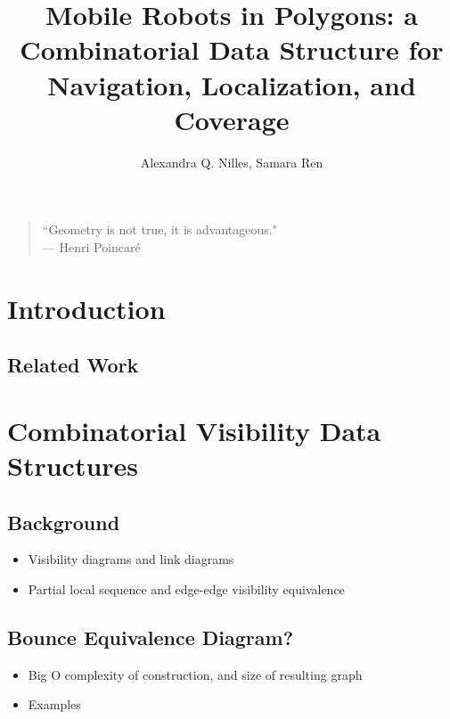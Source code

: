 \documentclass[letterpaper, 10 pt, conference]{ieeeconf}  %
\title{Mobile Robots in Polygons: a Combinatorial Data Structure for
Navigation, Localization, and Coverage}
\author{Alexandra Q. Nilles, Samara Ren%
}
\begin{document}
\maketitle

%

{\small
\begin{center}
\begin{quotation}
``Geometry is not true, it is advantageous." \\
\hfill    --- Henri Poincar\'e
\end{quotation}
\end{center}
}

\section{Introduction} 


\subsection{Related Work}

\section{Combinatorial Visibility Data Structures}

\subsection{Background}

\begin{itemize}
\item Visibility diagrams and link diagrams
\item Partial local sequence and edge-edge visibility equivalence
\end{itemize}

\subsection{Bounce Equivalence Diagram?}

\begin{itemize}
\item Big O complexity of construction, and size of resulting graph
\item Examples
\end{itemize}
\end{document}
